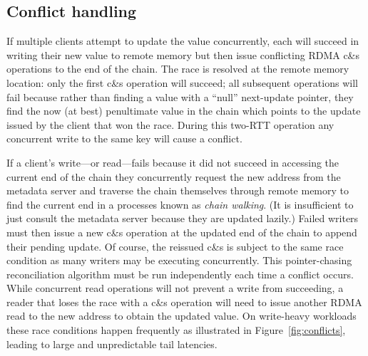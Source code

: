 \subsection{Conflict handling}

If multiple clients attempt to update the value concurrently, each
will succeed in writing their new value to remote memory but then
issue conflicting RDMA c\&s operations to the end of the chain.  The
race is resolved at the remote memory location: only the first c\&s
operation will succeed; all subsequent operations will fail because
rather than finding a value with a ``null'' next-update pointer, they
find the now (at best) penultimate value in the chain which points to
the update issued by the client that won the race.
During this
two-RTT operation any concurrent write to the same key will cause a
conflict.



If a client's write---or read---fails because it did not succeed in
accessing the current end of the chain they concurrently request the
new address from the metadata server and traverse the chain themselves
through remote memory to find the current end in a processes known as
\emph{chain walking}.  (It is insufficient to just consult the
metadata server because they are updated lazily.)  Failed writers must
then issue a new c\&s operation at the updated end of the chain to append
their pending update.  Of course, the reissued c\&s is subject to the
same race condition as many writers may be executing
concurrently. This pointer-chasing reconciliation algorithm must be
run independently each time a conflict occurs.
While concurrent read operations will not prevent a write from
succeeding, a reader that loses the race with a c\&s operation will
need to issue another RDMA read to the new address to obtain the
updated value.  On write-heavy workloads these race conditions happen
frequently as illustrated in Figure~\ref{fig:conflicts},
leading to large and unpredictable tail latencies.




